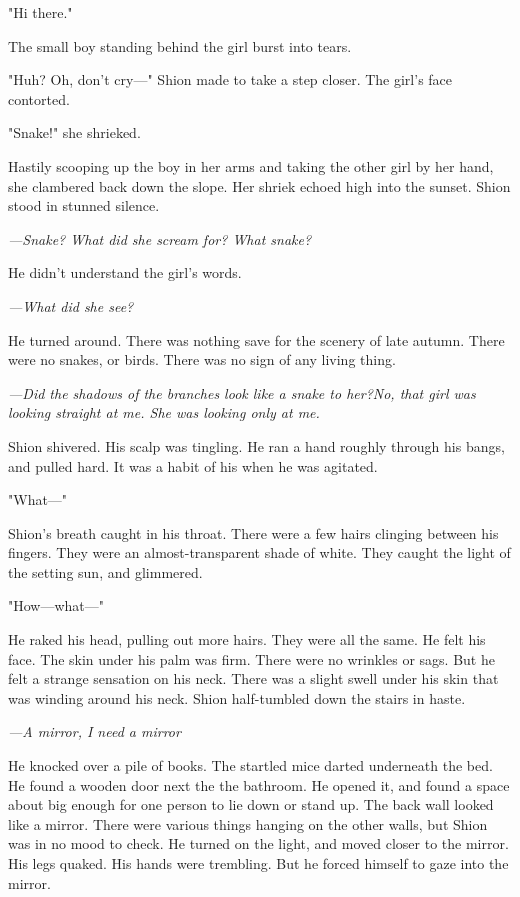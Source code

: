 "Hi there."

The small boy standing behind the girl burst into tears.

"Huh? Oh, don't cry---" Shion made to take a step closer. The girl's face
contorted.

"Snake!" she shrieked.

Hastily scooping up the boy in her arms and taking the other girl by her
hand, she clambered back down the slope. Her shriek echoed high into the
sunset. Shion stood in stunned silence.

\emph{---Snake? What did she scream for? What snake?}

He didn't understand the girl's words.

\emph{---What did she see?}

He turned around. There was nothing save for the scenery of late autumn.
There were no snakes, or birds. There was no sign of any living thing.

\emph{---Did the shadows of the branches look like a snake to her?\el No, that
girl was looking straight at me. She was looking only at me.}

Shion shivered. His scalp was tingling. He ran a hand roughly through
his bangs, and pulled hard. It was a habit of his when he was agitated.

"What---"

Shion's breath caught in his throat. There were a few hairs clinging
between his fingers. They were an almost-transparent shade of white.
They caught the light of the setting sun, and glimmered.

"How---what---"

He raked his head, pulling out more hairs. They were all the same. He
felt his face. The skin under his palm was firm. There were no wrinkles
or sags. But he felt a strange sensation on his neck. There was a slight
swell under his skin that was winding around his neck. Shion
half-tumbled down the stairs in haste.

\emph{---A mirror, I need a mirror\el }

He knocked over a pile of books. The startled mice darted underneath the
bed. He found a wooden door next the the bathroom. He opened it, and
found a space about big enough for one person to lie down or stand up.
The back wall looked like a mirror. There were various things hanging on
the other walls, but Shion was in no mood to check. He turned on the
light, and moved closer to the mirror. His legs quaked. His hands were
trembling. But he forced himself to gaze into the mirror.

